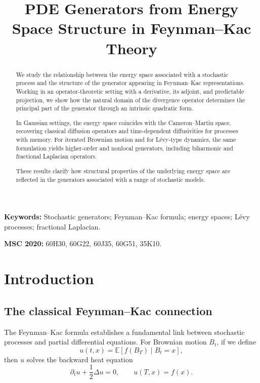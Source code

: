 \documentclass[11pt]{article}
\title{PDE Generators from Energy Space Structure in Feynman--Kac Theory}
\author{}
\date{}
\theoremstyle{definition}
\newcommand{\E}{\mathbb{E}}
\begin{document}
\maketitle

\begin{abstract}
We study the relationship between the energy space associated with a stochastic process and the structure of the generator appearing in Feynman--Kac representations. Working in an operator-theoretic setting with a derivative, its adjoint, and predictable projection, we show how the natural domain of the divergence operator determines the principal part of the generator through an intrinsic quadratic form.

In Gaussian settings, the energy space coincides with the Cameron--Martin space, recovering classical diffusion operators and time-dependent diffusivities for processes with memory. For iterated Brownian motion and for L\'evy-type dynamics, the same formulation yields higher-order and nonlocal generators, including biharmonic and fractional Laplacian operators.

These results clarify how structural properties of the underlying energy space are reflected in the generators associated with a range of stochastic models.
\end{abstract}

\noindent\textbf{Keywords:} Stochastic generators; Feynman--Kac formula; energy spaces; L\'evy processes; fractional Laplacian.

\noindent\textbf{MSC 2020:} 60H30, 60G22, 60J35, 60G51, 35K10.

\newpage

\section{Introduction}

\subsection{The classical Feynman--Kac connection}

The Feynman--Kac formula establishes a fundamental link between stochastic processes and partial differential equations. For Brownian motion $B_t$, if we define
\begin{equation}\label{eq:fk-def}
u(t,x) = \E[f(B_T) \mid B_t = x],
\end{equation}
then $u$ solves the backward heat equation
\begin{equation}\label{eq:heat}
\partial_t u + \frac{1}{2}\Delta u = 0, \qquad u(T,x) = f(x).
\end{equation}
\end{document}
